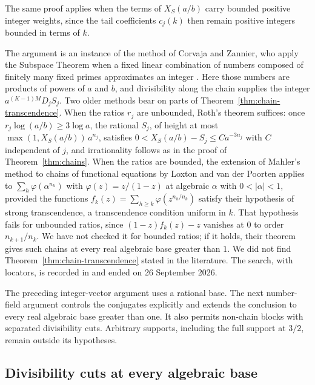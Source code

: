 \documentclass[11pt]{article}
\begin{document}
The same proof applies when the terms of $X_S(a/b)$ carry bounded positive
integer weights, since the tail coefficients $c_j(k)$ then remain positive
integers bounded in terms of $k$.

The argument is an instance of the method of Corvaja and Zannier, who apply
the Subspace Theorem when a fixed linear combination of numbers composed of
finitely many fixed primes approximates an integer
\cite[Theorem~4]{corvajazannier2002}. Here those numbers are products of powers
of $a$ and $b$, and divisibility along the chain supplies the integer
$a^{(K-1)M}D_jS_j$. Two older methods bear on parts of
Theorem~\ref{thm:chain-transcendence}. When the ratios $r_j$ are unbounded,
Roth's theorem \cite{roth1955} suffices: once $r_j\log(a/b)\ge3\log a$, the
rational $S_j$, of height at most $\max(1,X_S(a/b))\,a^{n_j}$, satisfies
$0<X_S(a/b)-S_j\le Ca^{-3n_j}$ with $C$ independent of $j$, and irrationality
follows as in the proof of Theorem~\ref{thm:chains}. When the ratios are bounded, the extension of
Mahler's method to chains of functional equations by Loxton and van der
Poorten \cite[Theorem~4, p.~38]{loxtonvanderpoorten1977} applies to
$\sum_h\varphi(\alpha^{n_h})$ with $\varphi(z)=z/(1-z)$ at algebraic $\alpha$
with $0<|\alpha|<1$, provided the functions
$f_k(z)=\sum_{h\ge k}\varphi(z^{n_h/n_k})$ satisfy their hypothesis of strong
transcendence, a transcendence condition uniform in $k$. That hypothesis fails
for unbounded ratios, since $(1-z)f_k(z)-z$ vanishes at $0$ to order
$n_{k+1}/n_k$. We have not checked it for bounded ratios; if it holds, their
theorem gives such chains at every real algebraic base greater than $1$. We did
not find Theorem~\ref{thm:chain-transcendence} stated in the literature. The
search, with locators, is recorded in
 and ended on
26 September 2026.

The preceding integer-vector argument uses a rational base. The next
number-field argument controls the conjugates explicitly and extends the
conclusion to every real algebraic base greater than one. It also permits
non-chain blocks with separated divisibility cuts. Arbitrary supports,
including the full support at $3/2$, remain outside its hypotheses.

\subsection{Divisibility cuts at every algebraic base}
\label{sec:separated-cuts}
\end{document}
